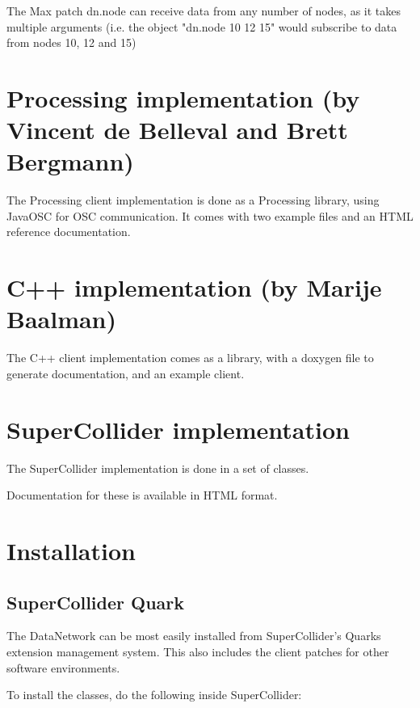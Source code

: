 \documentclass[letterpaper,10pt]{article}
\begin{document}
The Max patch dn.node can receive data from any number of nodes, as it takes multiple arguments (i.e. the object "dn.node 10 12 15" would subscribe to data from nodes 10, 12 and 15)

\section{Processing implementation (by Vincent de Belleval and Brett Bergmann)}

The Processing client implementation is done as a Processing library, using JavaOSC for OSC communication. It comes with two example files and an HTML reference documentation.

\section{C++ implementation (by Marije Baalman)}

The C++ client implementation comes as a library, with a doxygen file to generate documentation, and an example client.

\section{SuperCollider implementation}

The SuperCollider implementation is done in a set of classes.

Documentation for these is available in HTML format.


\section{Installation}

\subsection{SuperCollider Quark}

The DataNetwork can be most easily installed from SuperCollider's Quarks extension management system.
This also includes the client patches for other software environments.

To install the classes, do the following inside SuperCollider:
\end{document}
